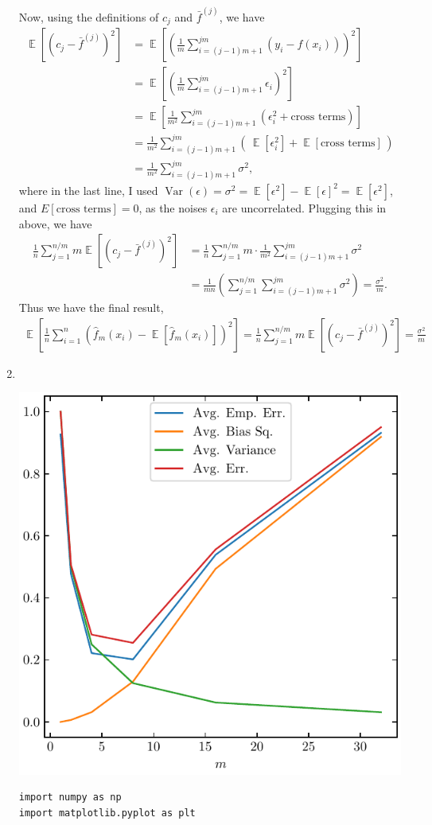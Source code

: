 \documentclass{article}
\DeclareMathOperator{\E}{\mathbb{E}}
\DeclareMathOperator{\var}{Var}
\begin{document}
\begin{enumerate}
        Now, using the definitions of $c_j$ and $\bar{f}^{(j)}$, we have
        \begin{align*}
                \E \left[ (c_j - \bar{f}^{(j)})^2 \right] 
                &= \E \left[ \left( \frac{1}{m} \sum_{i=(j-1)m+1}^{jm} (y_i - f(x_i)) \right)^2 \right] \\
                &=  \E \left[ \left( \frac{1}{m} \sum_{i=(j-1)m+1}^{jm} \epsilon_i \right)^2 \right] \\
                &=  \E \left[ \frac{1}{m^2} \sum_{i=(j-1)m+1}^{jm} (\epsilon_i^2 + \text{cross terms}) \right] \\
                &= \frac{1}{m^2} \sum_{i=(j-1)m+1}^{jm} \left( \, \E[\epsilon_i^2] + \E[\text{cross terms}] \, \right) \\
                &= \frac{1}{m^2} \sum_{i=(j-1)m+1}^{jm} \sigma^2,
        \end{align*}
        where in the last line, I used $\var(\epsilon) = \sigma^2 = \E[\epsilon^2] - \E[\epsilon]^2 = \E[\epsilon^2]$, and $E[\text{cross terms}] = 0$, as the noises $\epsilon_i$ are uncorrelated.
        Plugging this in above, we have
        \begin{align*}
                \frac{1}{n} \sum_{j=1}^{n/m} m \E \left[ (c_j - \bar{f}^{(j)})^2 \right]
                &= \frac{1}{n} \sum_{j=1}^{n/m} m \cdot \frac{1}{m^2} \sum_{i=(j-1)m+1}^{jm} \sigma^2 \\
                &= \frac{1}{mn} \left( \sum_{j=1}^{n/m} \sum_{i=(j-1)m+1}^{jm} \sigma^2 \right) = \frac{\sigma^2}{m}.
        \end{align*}
        Thus we have the final result, 
        \begin{align*}
                \E \left[ \frac{1}{n} \sum_{i=1}^n (\hat{f}_m(x_i) - \E[\hat{f}_m(x_i)])^2 \right]
                = \frac{1}{n} \sum_{j=1}^{n/m} m \E \left[ (c_j - \bar{f}^{(j)})^2 \right]
                = \frac{\sigma^2}{m}
        \end{align*}
        \item \,
        \begin{center}
                \includegraphics[width=0.5\linewidth]{B1d.pdf}
        \end{center}
        \begin{verbatim}
import numpy as np
import matplotlib.pyplot as plt


\end{verbatim}
\end{enumerate}
\end{document}
